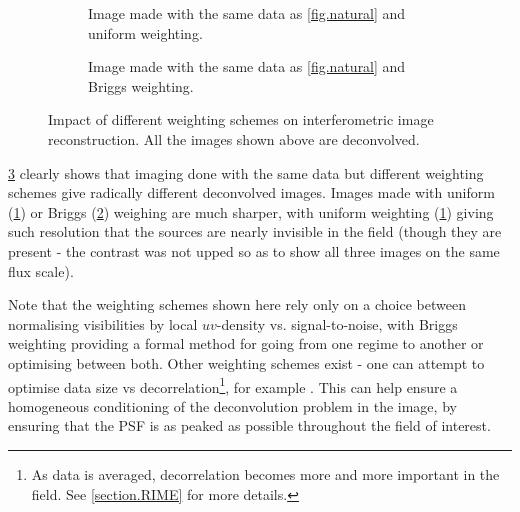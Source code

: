 \begin{figure}[h!]
\begin{subfigure}{.48\textwidth}
\caption{\label{fig.uniform} Image made with the same data as \cref{fig.natural} and uniform weighting.}
\end{subfigure}
\hfill
\begin{subfigure}{.48\textwidth}
\caption{\label{fig.briggs0} Image made with the same data as \cref{fig.natural} and Briggs weighting.}
\end{subfigure}
\caption{\label{fig.briggs-weighting}Impact of different weighting schemes on interferometric image reconstruction. All the images shown above are deconvolved.}
\end{figure}

\pg
\cref{fig.briggs-weighting} clearly shows that imaging done with the same data but different weighting schemes give radically different deconvolved images. Images made with uniform (\cref{fig.uniform}) or Briggs (\cref{fig.briggs0}) weighing are much sharper, with uniform weighting (\cref{fig.uniform}) giving such resolution that the sources are nearly invisible in the field (though they are present - the contrast was not upped so as to show all three images on the same flux scale). 

\pg
Note that the weighting schemes shown here rely only on a choice between normalising visibilities by local $uv$-density vs. signal-to-noise, with Briggs weighting providing a formal method for going from one regime to another or optimising between both. Other weighting schemes exist - one can attempt to optimise data size vs decorrelation\footnote{As data is averaged, decorrelation becomes more and more important in the field. See \cref{section.RIME} for more details.}, for example . This can help ensure a homogeneous conditioning of the deconvolution problem in the image, by ensuring that the PSF is as peaked as possible throughout the field of interest.

